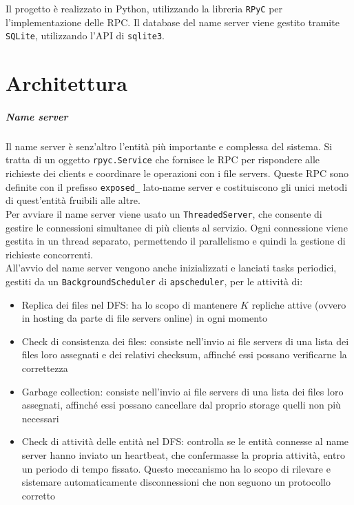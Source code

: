 \documentclass[a4paper, 12pt]{scrreprt}
\begin{document}
        Il progetto è realizzato in Python, utilizzando la libreria \texttt{RPyC} per l'implementazione delle RPC. Il database del name server viene gestito tramite \texttt{SQLite}, utilizzando l'API di \texttt{sqlite3}.

    \chapter{Architettura}

        \paragraph{Name server}

            Il name server è senz'altro l'entità più importante e complessa del sistema. Si tratta di un oggetto \texttt{rpyc.Service} che fornisce le RPC per rispondere alle richieste dei clients e coordinare le operazioni con i file servers. Queste RPC sono definite con il prefisso \texttt{exposed\_} lato-name server e costituiscono gli unici metodi di quest'entità fruibili alle altre.\\
            Per avviare il name server viene usato un \texttt{ThreadedServer}, che consente di gestire le connessioni simultanee di più clients al servizio. Ogni connessione viene gestita in un thread separato, permettendo il parallelismo e quindi la gestione di richieste concorrenti.\\
            All'avvio del name server vengono anche inizializzati e lanciati tasks periodici, gestiti da un \texttt{BackgroundScheduler} di \texttt{apscheduler}, per le attività di:

            \begin{itemize}

                \item Replica dei files nel DFS: ha lo scopo di mantenere $K$ repliche attive (ovvero in hosting da parte di file servers online) in ogni momento

                \item Check di consistenza dei files: consiste nell'invio ai file servers di una lista dei files loro assegnati e dei relativi checksum, affinché essi possano verificarne la correttezza

                \item Garbage collection: consiste nell'invio ai file servers di una lista dei files loro assegnati, affinché essi possano cancellare dal proprio storage quelli non più necessari

                \item Check di attività delle entità nel DFS: controlla se le entità connesse al name server hanno inviato un heartbeat, che confermasse la propria attività, entro un periodo di tempo fissato. Questo meccanismo ha lo scopo di rilevare e sistemare automaticamente disconnessioni che non seguono un protocollo corretto

            \end{itemize}
\end{document}
